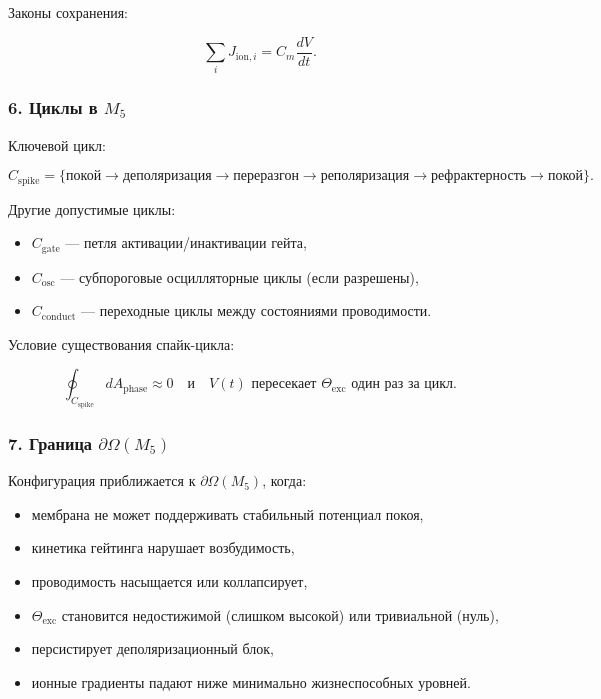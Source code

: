 Законы сохранения:

\[
\sum_i J_{\mathrm{ion},i} = C_m \frac{dV}{dt}.
\]

\subsubsection*{6. Циклы в \texorpdfstring{$M_5$}{M_5}}

Ключевой цикл:

\[
C_{\mathrm{spike}}
=
\{\text{покой} \to \text{деполяризация} \to
\text{переразгон} \to \text{реполяризация} \to \text{рефрактерность} \to \text{покой}\}.
\]

Другие допустимые циклы:

\begin{itemize}
    \item $C_{\mathrm{gate}}$ — петля активации/инактивации гейта,
    \item $C_{\mathrm{osc}}$ — субпороговые осцилляторные циклы (если разрешены),
    \item $C_{\mathrm{conduct}}$ — переходные циклы между состояниями проводимости.
\end{itemize}

Условие существования спайк-цикла:

\[
\oint_{C_{\mathrm{spike}}} dA_{\mathrm{phase}} \approx 0
\quad\text{и}\quad
V(t) \text{ пересекает } \Theta_{\mathrm{exc}} \text{ один раз за цикл}.
\]

\subsubsection*{7. Граница \texorpdfstring{$\partial\Omega(M_5)$}{\partial\Omega(M_5)}}

Конфигурация приближается к $\partial\Omega(M_5)$, когда:

\begin{itemize}
    \item мембрана не может поддерживать стабильный потенциал покоя,
    \item кинетика гейтинга нарушает возбудимость,
    \item проводимость насыщается или коллапсирует,
    \item $\Theta_{\mathrm{exc}}$ становится недостижимой (слишком высокой) или тривиальной (нуль),
    \item персистирует деполяризационный блок,
    \item ионные градиенты падают ниже минимально жизнеспособных уровней.
\end{itemize}

